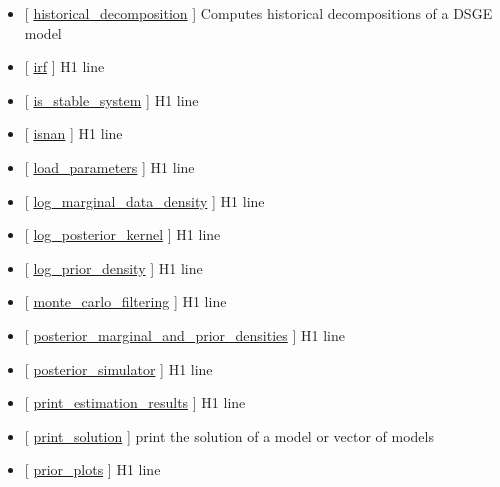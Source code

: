 \documentclass[letterpaper,10pt,english]{sphinxmanual}
\begin{document}
\begin{itemize}
\item {} 
{[} {\hyperref[classes/models/@dsge/dsge:historical-decomposition]{historical\_decomposition}} {]} Computes historical decompositions of a DSGE model

\item {} 
{[} {\hyperref[classes/models/@dsge/dsge:irf]{irf}} {]}   H1 line

\item {} 
{[} {\hyperref[classes/models/@dsge/dsge:is-stable-system]{is\_stable\_system}} {]}   H1 line

\item {} 
{[} {\hyperref[classes/models/@dsge/dsge:isnan]{isnan}} {]}   H1 line

\item {} 
{[} {\hyperref[classes/models/@dsge/dsge:load-parameters]{load\_parameters}} {]}   H1 line

\item {} 
{[} {\hyperref[classes/models/@dsge/dsge:log-marginal-data-density]{log\_marginal\_data\_density}} {]}   H1 line

\item {} 
{[} {\hyperref[classes/models/@dsge/dsge:log-posterior-kernel]{log\_posterior\_kernel}} {]}   H1 line

\item {} 
{[} {\hyperref[classes/models/@dsge/dsge:log-prior-density]{log\_prior\_density}} {]}   H1 line

\item {} 
{[} {\hyperref[classes/models/@dsge/dsge:monte-carlo-filtering]{monte\_carlo\_filtering}} {]}   H1 line

\item {} 
{[} {\hyperref[classes/models/@dsge/dsge:posterior-marginal-and-prior-densities]{posterior\_marginal\_and\_prior\_densities}} {]}   H1 line

\item {} 
{[} {\hyperref[classes/models/@dsge/dsge:posterior-simulator]{posterior\_simulator}} {]}   H1 line

\item {} 
{[} {\hyperref[classes/models/@dsge/dsge:print-estimation-results]{print\_estimation\_results}} {]}   H1 line

\item {} 
{[} {\hyperref[classes/models/@dsge/dsge:print-solution]{print\_solution}} {]}  print the solution of a model or vector of models

\item {} 
{[} {\hyperref[classes/models/@dsge/dsge:prior-plots]{prior\_plots}} {]}   H1 line


\end{itemize}
\end{document}
